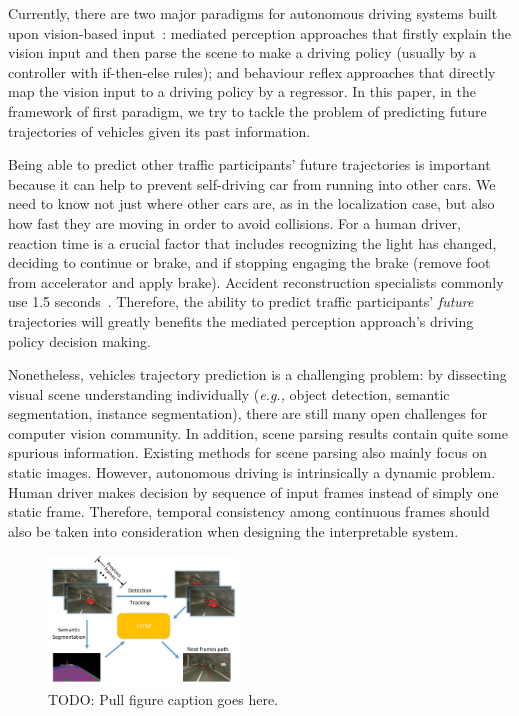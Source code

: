\documentclass[10pt,twocolumn,letterpaper]{article}
\begin{document}

Currently, there are two major paradigms for autonomous driving systems built upon vision-based input~\cite{chen2015deepdriving}: mediated perception approaches that firstly explain the vision input and then parse the scene to make a driving policy (usually by a controller with if-then-else rules); and behaviour reflex approaches that directly map the vision input to a driving policy by a regressor.
In this paper, in the framework of first paradigm, we try to tackle the problem of predicting future trajectories of vehicles given its past information.


 Being able to predict other traffic participants' future trajectories is important because it can help to prevent self-driving car from running into other cars. We need to know not just where other cars are, as in the localization case, but also how fast they are moving in order to avoid collisions.
For a human driver, reaction time is a crucial factor that includes recognizing the light has changed, deciding to continue or brake, and if stopping engaging the brake (remove foot from accelerator and apply brake). Accident reconstruction specialists commonly use 1.5 seconds~\cite{mcgehee2000driver}.
Therefore, the ability to predict traffic participants' \emph{future} trajectories will greatly benefits the mediated perception approach's driving policy decision making.



Nonetheless, vehicles trajectory prediction is a challenging problem: by dissecting visual scene understanding individually (\emph{e.g.,} object detection, semantic segmentation, instance segmentation),  there are still many open challenges for computer vision community.
In addition, scene parsing results contain quite some spurious information. 
Existing methods for scene parsing also mainly focus on static images. 
However, autonomous driving is intrinsically a dynamic problem. Human driver makes decision by sequence of input frames instead of simply one static frame.
Therefore, temporal consistency among continuous frames should also be taken into consideration when designing the interpretable system.


\begin{figure}[t]
        \centering
        \includegraphics[width=0.45\textwidth]{figures/pull_figure.pdf}
        \caption{ {\small TODO: Pull figure caption goes here.}}
        \label{fig:pull_figure}
\end{figure}
\end{document}
